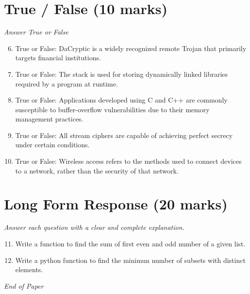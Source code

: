\documentclass[12pt]{article}
\begin{document}
\section*{True / False (10 marks)}
\textit{Answer True or False}
\begin{enumerate}[label=\arabic*.]
\setcounter{enumi}{5}
\item True or False: DaCryptic is a widely recognized remote Trojan that primarily targets financial institutions.
\item True or False: The stack is used for storing dynamically linked libraries required by a program at runtime.
\item True or False: Applications developed using C and C++ are commonly susceptible to buffer-overflow vulnerabilities due to their memory management practices.
\item True or False: All stream ciphers are capable of achieving perfect secrecy under certain conditions.
\item True or False: Wireless access refers to the methods used to connect devices to a network, rather than the security of that network.
\end{enumerate}

\section*{Long Form Response (20 marks)}
\textit{Answer each question with a clear and complete explanation.}
\begin{enumerate}[label=\arabic*.]
\setcounter{enumi}{10}
\item Write a function to find the sum of first even and odd number of a given list.
\item Write a python function to find the minimun number of subsets with distinct elements.
\end{enumerate}

\vfill
\noindent\textit{End of Paper}
\end{document}
